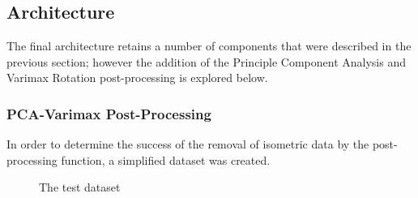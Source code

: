 \documentclass[a4paper,11pt,titlepage]{article}
\begin{document}
	\subsection{Architecture}
	The final architecture retains a number of components that were described in the previous section; however the addition of the Principle Component Analysis and Varimax Rotation post-processing is explored below. 
	\par 
	
	\subsubsection{PCA-Varimax Post-Processing}
	In order to determine the success of the removal of isometric data by the post-processing function, a simplified dataset was created.
	\par 
		
	\begin{figure}[H]
    			\caption{The test dataset}%
	\end{figure}	
	
\end{document}
